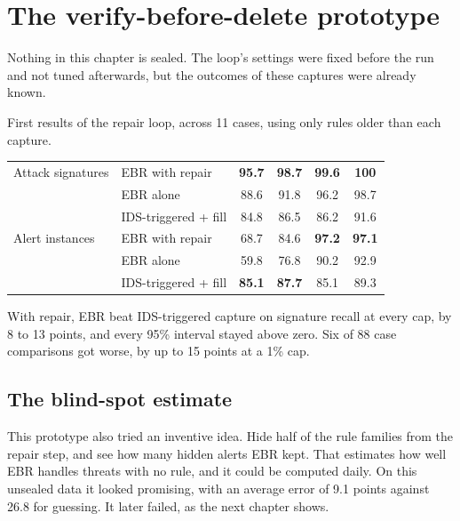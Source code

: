 \chapter{The verify-before-delete prototype}
\label{ch:proto}

\begin{careful}
Nothing in this chapter is sealed. The loop's settings were fixed before the run and not tuned afterwards, but the outcomes of these captures were already known.
\end{careful}

\begin{gtable}{First results of the repair loop, across 11 cases, using only rules older than each capture.}
\begin{tabularx}{.92\linewidth}{l L c c c c}
\toprule
{} &  &  &  &  & \\
\midrule
Attack signatures & EBR with repair & \textbf{95.7} & \textbf{98.7} & \textbf{99.6} & \textbf{100}\\
 & EBR alone & 88.6 & 91.8 & 96.2 & 98.7\\
 & IDS-triggered + fill & 84.8 & 86.5 & 86.2 & 91.6\\
\midrule
Alert instances & EBR with repair & 68.7 & 84.6 & \textbf{97.2} & \textbf{97.1}\\
 & EBR alone & 59.8 & 76.8 & 90.2 & 92.9\\
 & IDS-triggered + fill & \textbf{85.1} & \textbf{87.7} & 85.1 & 89.3\\
\bottomrule
\end{tabularx}
\end{gtable}

With repair, EBR beat IDS-triggered capture on signature recall at every cap, by 8 to 13 points, and every 95\% interval stayed above zero. Six of 88 case comparisons got worse, by up to 15 points at a 1\% cap.

\section{The blind-spot estimate}
This prototype also tried an inventive idea. Hide half of the rule families from the repair step, and see how many hidden alerts EBR kept. That estimates how well EBR handles threats with no rule, and it could be computed daily. On this unsealed data it looked promising, with an average error of 9.1 points against 26.8 for guessing. It later failed, as the next chapter shows.

